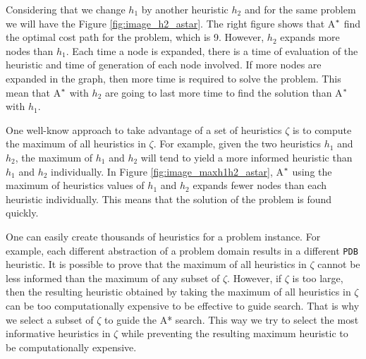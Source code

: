 Considering that we change $h_{1}$ by another heuristic $h_2$ and for the same problem we will have the Figure \ref{fig:image_h2_astar}. The right figure shows that A$\sp{*}$ find the optimal cost path for the problem, which is 9. However, $h_{2}$ expands more nodes than $h_{1}$. Each time a node is expanded, there is a time of evaluation of the heuristic and time of generation of each node involved. If more nodes are expanded in the graph, then more time is required to solve the problem. This mean that A$\sp{*}$ with $h_{2}$ are going to last more time to find the solution than A$\sp{*}$ with $h_{1}$.

One well-know approach to take advantage of a set of heuristics $\zeta$ is to compute the maximum of all heuristics in $\zeta$. For example, given the two heuristics $h_1$ and $h_2$, the maximum of $h_1$ and $h_2$ will tend to yield a more informed heuristic than $h_1$ and $h_2$ individually. In Figure \ref{fig:image_maxh1h2_astar}, A$\sp{*}$ using the maximum of heuristics values of $h_{1}$ and $h_{2}$ expands fewer nodes than each heuristic individually. This means that the solution of the problem is found quickly.

One can easily create thousands of heuristics for a problem instance. For example, each different abstraction of a problem domain results in a different \texttt{PDB} heuristic. It is possible to prove that the maximum of all heuristics in $\zeta$ cannot be less informed than the maximum of any subset of $\zeta$. However, if $\zeta$ is too large, then the resulting heuristic obtained by taking the maximum of all heuristics in $\zeta$ can be too computationally expensive to be effective to guide search. That is why we select a subset of $\zeta$ to guide the A* search. This way we try to select the most informative heuristics in $\zeta$ while preventing the resulting maximum heuristic to be computationally expensive. 




